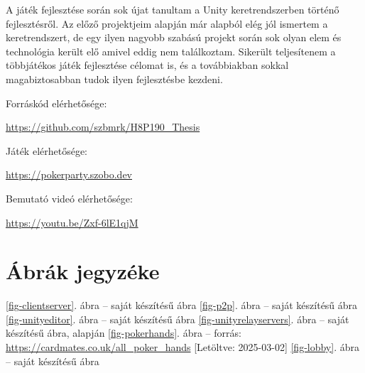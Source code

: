 \documentclass[]{thesis-ekf}
\theoremstyle{definition}
\theoremstyle{remark}
\begin{document}
A játék fejlesztése során sok újat tanultam a Unity keretrendszerben történő fejlesztésről. Az előző projektjeim alapján már alapból elég jól ismertem a keretrendszert, de egy ilyen nagyobb szabású projekt során sok olyan elem és technológia került elő amivel eddig nem találkoztam. Sikerült teljesítenem a többjátékos játék fejlesztése célomat is, és a továbbiakban sokkal magabiztosabban tudok ilyen fejlesztésbe kezdeni.

\begin{center}
	Forráskód elérhetősége:
	
	{\color{teal}\url{https://github.com/szbmrk/H8P190_Thesis}}
	
	Játék elérhetősége:
	
	{\color{teal}\url{https://pokerparty.szobo.dev}}
	
	Bemutató videó elérhetősége:
	
	{\color{teal}\url{https://youtu.be/Zxf-6lE1qjM}}
\end{center}

\chapter*{Ábrák jegyzéke}

\ref{fig-clientserver}. ábra -- saját készítésű ábra
\newline
\ref{fig-p2p}. ábra -- saját készítésű ábra
\newline
\ref{fig-unityeditor}. ábra -- saját készítésű ábra
\newline
\ref{fig-unityrelayservers}. ábra -- saját készítésű ábra, \cite{UnityRelayServers} alapján
\newline
\ref{fig-pokerhands}. ábra -- forrás: \url{https://cardmates.co.uk/all_poker_hands} [Letöltve: 2025-03-02]  
\newline
\ref{fig-lobby}. ábra -- saját készítésű ábra
\end{document}
